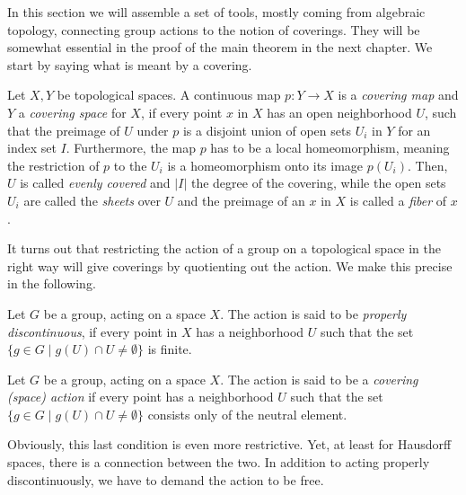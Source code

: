 In this section we will assemble a set of tools, mostly coming from algebraic topology, connecting group actions to the notion of coverings.
They will be somewhat essential in the proof of the main theorem in the next chapter.
We start by saying what is meant by a covering.

\begin{definition}\label{def:covering}
    Let \(X, Y\) be topological spaces.
    A continuous map \(p: Y\to X\) is a \emph{covering map} and \(Y\) a \emph{covering space} for \(X\), if every point \(x\) in \(X\) has an open neighborhood \(U\), such that the preimage of \(U\) under \(p\) is a disjoint union of open sets \(U_i\) in \(Y\) for an index set \(I\).
    Furthermore, the map \(p\) has to be a local homeomorphism, meaning the restriction of \(p\) to the \(U_i\) is a homeomorphism onto its image \(p(U_i)\).
    Then, \(U\) is called \emph{evenly covered} and \(\vert I \vert\) the degree of the covering, while the open sets \(U_i\) are called the \emph{sheets} over \(U\) and the preimage of an \(x\) in \(X\) is called a \emph{fiber} of \(x\).
\end{definition}

It turns out that restricting the action of a group on a topological space in the right way will give coverings by quotienting out the action.
We make this precise in the following.

\begin{definition}
    Let \(G\) be a group, acting on a space \(X\).
    The action is said to be \emph{properly discontinuous}, if every point in \(X\) has a neighborhood \(U\) such that the set \(\{g\in G\;\vert\; g(U)\cap U \neq \emptyset\}\) is finite.
\end{definition}

\begin{definition}
    Let \(G\) be a group, acting on a space \(X\).
    The action is said to be a \emph{covering (space) action} if every point has a neighborhood \(U\) such that the set \(\{g\in G \;\vert\; g(U)\cap U \neq \emptyset\}\) consists only of the neutral element.
\end{definition}

Obviously, this last condition is even more restrictive.
Yet, at least for Hausdorff spaces, there is a connection between the two.
In addition to acting properly discontinuously, we have to demand the action to be free.

